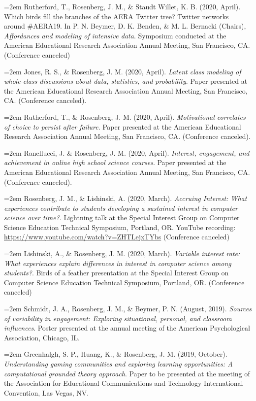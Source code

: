 \documentclass[
  14,
]{article}
\begin{document}
\hangindent=2em Rutherford, T., Rosenberg, J. M., \& Staudt Willet, K.
B. (2020, April). Which birds fill the branches of the AERA Twitter
tree? Twitter networks around \#AERA19. In P. N. Beymer, D. K. Benden,
\& M. L. Bernacki (Chairs), \emph{Affordances and modeling of intensive
data}. Symposium conducted at the American Educational Research
Association Annual Meeting, San Francisco, CA. (Conference canceled)

\hangindent=2em Jones, R. S., \& Rosenberg, J. M. (2020, April).
\emph{Latent class modeling of whole-class discussions about data,
statistics, and probability}. Paper presented at the American
Educational Research Association Annual Meeting, San Francisco, CA.
(Conference canceled).

\hangindent=2em Rutherford, T., \& Rosenberg, J. M. (2020, April).
\emph{Motivational correlates of choice to persist after failure}. Paper
presented at the American Educational Research Association Annual
Meeting, San Francisco, CA. (Conference canceled).

\hangindent=2em Ranellucci, J. \& Rosenberg, J. M. (2020, April).
\emph{Interest, engagement, and achievement in online high school
science courses}. Paper presented at the American Educational Research
Association Annual Meeting, San Francisco, CA. (Conference canceled).

\hangindent=2em Rosenberg, J. M., \& Lishinski, A. (2020, March).
\emph{Accruing Interest: What experiences contribute to students
developing a sustained interest in computer science over time?}.
Lightning talk at the Special Interest Group on Computer Science
Education Technical Symposium, Portland, OR. YouTube recording:
\url{https://www.youtube.com/watch?v=ZHTLejxTYbs} (Conference canceled)

\hangindent=2em Lishinski, A., \& Rosenberg, J. M. (2020, March).
\emph{Variable interest rate: What experiences explain differences in
interest in computer science among students?}. Birds of a feather
presentation at the Special Interest Group on Computer Science Education
Technical Symposium, Portland, OR. (Conference canceled)

\hangindent=2em Schmidt, J. A., Rosenberg, J. M., \& Beymer, P. N.
(August, 2019). \emph{Sources of variability in engagement: Exploring
situational, personal, and classroom influences}. Poster presented at
the annual meeting of the American Psychological Association, Chicago,
IL.

\hangindent=2em Greenhalgh, S. P., Huang, K., \& Rosenberg, J. M. (2019,
October). \emph{Understanding gaming communities and exploring learning
opportunities: A computational grounded theory approach}. Paper to be
presented at the meeting of the Association for Educational
Communications and Technology International Convention, Las Vegas, NV.
\end{document}
